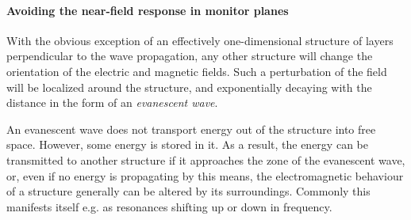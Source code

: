\paragraph{Avoiding the near-field response in monitor planes} %
\label{par_nearfield}
With the obvious exception of an effectively one-dimensional structure of layers perpendicular to the wave propagation, any other structure will change the orientation of the electric and magnetic fields. Such a perturbation of the field will be localized around the structure, and exponentially decaying with the distance in the form of an \textit{evanescent wave}.

An evanescent wave does not transport energy out of the structure into free space. However, some energy is stored in it. As a result, the energy can be transmitted to another structure if it approaches the zone of the evanescent wave, or, even if no energy is propagating by this means, the electromagnetic behaviour of a structure generally can be altered by its surroundings. Commonly this manifests itself e.g. as resonances shifting up or down in frequency.

